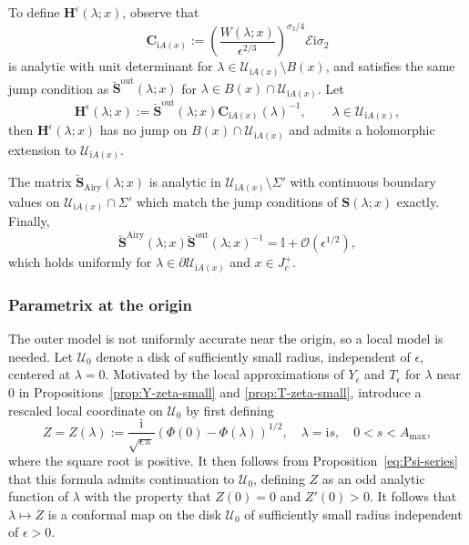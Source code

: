 \documentclass[12pt]{amsart}
\numberwithin{equation}{section}
\newcommand{\ii}{\mathrm{i}}
\newcommand{\SP}{\lambda}
\newcommand{\phaseint}{\Phi}
\newcommand{\eps}{\epsilon}
\newcommand{\bigo}[1]{ \mathcal{O}\! \left( #1 \right) }
\begin{document}
To define $\mathbf{H}^\eps(\SP;x)$, observe that 
\begin{equation}
	\mathbf{C}_{\ii A(x)} := \left( \frac{W(\SP;x)}{\eps^{2/3}}
	\right)^{\sigma_3/4} \boldsymbol{\mathcal{E}} \ii\sigma_2
\end{equation}
is analytic with unit determinant for $\SP \in \mathcal{U}_{\ii A(x)} \setminus B(x)$, and satisfies the same jump condition as $\breve{\mathbf{S}}^{\mathrm{out}}(\SP;x)$ for $\SP \in B(x) \cap \mathcal{U}_{\ii A(x)}$. 
Let
\begin{equation}
	\mathbf{H}^\eps(\SP;x) := \breve{\mathbf{S}}^{\mathrm{out}}(\SP;x) \mathbf{C}_{\ii A(x)}(\SP)^{-1}, 
	\qquad \SP \in \mathcal{U}_{\ii A(x)},
\end{equation}
then $\mathbf{H}^\eps(\SP;x)$ has no jump on $ B(x) \cap \mathcal{U}_{\ii A(x)}$ and admits a holomorphic extension to $\mathcal{U}_{\ii A(x)}$.

\begin{prop}
The matrix $\breve{\mathbf{S}}_{\mathrm{Airy}}(\SP;x)$ is analytic in $\mathcal{U}_{\ii A(x)} \setminus \Sigma'$ with continuous boundary values on $\mathcal{U}_{\ii A(x)} \cap \Sigma'$ which  match the jump conditions of $\mathbf{S}(\SP;x)$ exactly. Finally, 
\begin{equation}
	\breve{\mathbf{S}}^{\mathrm{Airy}}(\SP;x) \breve{\mathbf{S}}^{\mathrm{out}}(\SP;x)^{-1} = \mathbb{I } + \bigo{\eps^{1/2}}, 
\end{equation}
which holds uniformly for $\SP \in \partial \mathcal{U}_{\ii A(x)}$ and $x \in J_c^+$.
\label{prop:Airy.match}
\end{prop}


\subsubsection{Parametrix at the origin}
The outer model is not uniformly accurate near the origin, so a local model is needed. Let $\mathcal{U}_0$ denote a disk of sufficiently small radius, independent of $\eps$, centered at $\SP =0$. 
Motivated by the local approximations of $Y_\epsilon$ and $T_\epsilon$ for $\SP$ near 0 in Propositions~\ref{prop:Y-zeta-small} and \ref{prop:T-zeta-small}, introduce a rescaled local coordinate on $\mathcal{U}_0$ by first defining
\begin{equation}
	Z= Z(\SP) :=  \frac{\ii}{\sqrt{\eps \pi}} \left( \phaseint(0) - \phaseint(\SP) \right)^{1/2},\quad\lambda=\ii s,\quad 0<s<A_\mathrm{max},
	\label{eq:Z0-coord}
\end{equation}
where the square root is positive. It then follows from Proposition~\ref{eq:Psi-series} that this formula admits continuation to $\mathcal{U}_0$, defining $Z$ as an odd analytic function of $\SP$ with the property that $Z(0)=0$ and $Z'(0) > 0$. It follows that $\SP \mapsto Z$ is a conformal map on the disk $\mathcal{U}_0$ of sufficiently small radius independent of $\eps>0$. 
\end{document}
